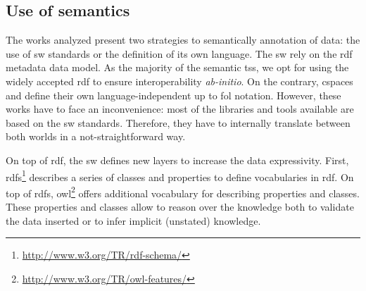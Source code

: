\subsection{Use of semantics}

The works analyzed present two strategies to semantically annotation of data: the use of \ac{sw} standards or the definition of its own language.
The \ac{sw} rely on the \ac{rdf} metadata data model. %
As the majority of the semantic \ac{ts}s, we opt for using the widely accepted \ac{rdf} to ensure interoperability \emph{ab-initio}.
On the contrary, \ac{cspaces} \citep{martinrecuerda_towards_2005} and \citet{nardini_semantic_2013} define their own language-independent up to \ac{fol} notation.
However, these works have to face an inconvenience: most of the libraries and tools available are based on the \ac{sw} standards. %
Therefore, they have to internally translate between both worlds in a not-straightforward way. %



On top of \ac{rdf}, the \ac{sw} defines new layers to increase the data expressivity.
First, \ac{rdfs}\footnote{\url{http://www.w3.org/TR/rdf-schema/}} describes a series of classes and properties to define vocabularies in \ac{rdf}.
On top of \ac{rdfs}, \ac{owl}\footnote{\url{http://www.w3.org/TR/owl-features/}} offers additional vocabulary for describing properties and classes.
These properties and classes allow to reason over the knowledge both to validate the data inserted or to infer implicit (unstated) knowledge. %



